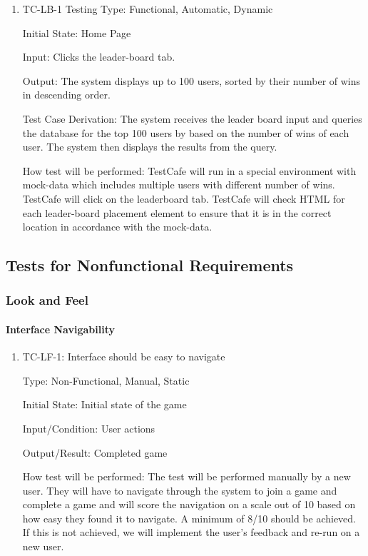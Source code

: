\documentclass[12pt, titlepage]{article}
\begin{document}
\begin{enumerate}
    \item {TC-LB-1}
    Testing Type: Functional, Automatic, Dynamic
					
Initial State: Home Page
					
Input: Clicks the leader-board tab.
					
Output: The system displays up to 100 users, sorted by their number of wins in descending order.

Test Case Derivation: The system receives the leader board input and queries the database for the top 100 users by based on the number of wins of each user. The system then displays the results from the query.
					
How test will be performed: TestCafe will run in a special environment with mock-data which includes multiple users with different number of wins. TestCafe will click on the leaderboard tab. TestCafe will check HTML for each leader-board placement element to ensure that it is in the correct location in accordance with the mock-data.
\end{enumerate}


\subsection{Tests for Nonfunctional Requirements}


\subsubsection{Look and Feel}

\paragraph{Interface Navigability}

\begin{enumerate}
\item{TC-LF-1: Interface should be easy to navigate}

Type: Non-Functional, Manual, Static
					
Initial State: Initial state of the game
					
Input/Condition: User actions
					
Output/Result: Completed game
					
How test will be performed: The test will be performed manually by a new user. They will have to navigate through the system to join a game and complete a game and will score the navigation on a scale out of 10 based on how easy they found it to navigate. A minimum of 8/10 should be achieved. If this is not achieved, we will implement the user's feedback and  re-run on a new user.
\end{enumerate}
\end{document}
